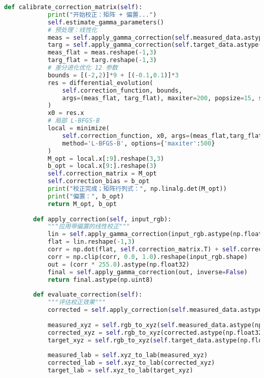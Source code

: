 \begin{lstlisting}[language=Python]
        def calibrate_correction_matrix(self):
            print("开始校正：矩阵 + 偏置...")
            self.estimate_gamma_parameters()
            # 预处理：线性化
            meas = self.apply_gamma_correction(self.measured_data.astype(np.float32), inverse=True)/255.0
            targ = self.apply_gamma_correction(self.target_data.astype(np.float32), inverse=True)/255.0
            meas_flat = meas.reshape(-1,3)
            targ_flat = targ.reshape(-1,3)
            # 差分进化优化 12 参数
            bounds = [(-2,2)]*9 + [(-0.1,0.1)]*3
            res = differential_evolution(
                self.correction_function, bounds,
                args=(meas_flat, targ_flat), maxiter=200, popsize=15, seed=42
            )
            x0 = res.x
            # 局部 L-BFGS-B
            local = minimize(
                self.correction_function, x0, args=(meas_flat,targ_flat),
                method='L-BFGS-B', options={'maxiter':500}
            )
            M_opt = local.x[:9].reshape(3,3)
            b_opt = local.x[9:].reshape(3)
            self.correction_matrix = M_opt
            self.correction_bias = b_opt
            print("校正完成；矩阵行列式：", np.linalg.det(M_opt))
            print("偏置：", b_opt)
            return M_opt, b_opt
    
        def apply_correction(self, input_rgb):
            """应用带偏置的线性校正"""
            lin = self.apply_gamma_correction(input_rgb.astype(np.float32), inverse=True)/255.0
            flat = lin.reshape(-1,3)
            corr = np.dot(flat, self.correction_matrix.T) + self.correction_bias
            corr = np.clip(corr, 0.0, 1.0).reshape(input_rgb.shape)
            out = (corr * 255.0).astype(np.float32)
            final = self.apply_gamma_correction(out, inverse=False)
            return final.astype(np.uint8)
        
        def evaluate_correction(self):
            """评估校正效果"""
            corrected = self.apply_correction(self.measured_data.astype(np.float32))
            
            measured_xyz = self.rgb_to_xyz(self.measured_data.astype(np.float32))
            corrected_xyz = self.rgb_to_xyz(corrected.astype(np.float32))
            target_xyz = self.rgb_to_xyz(self.target_data.astype(np.float32))
            
            measured_lab = self.xyz_to_lab(measured_xyz)
            corrected_lab = self.xyz_to_lab(corrected_xyz)
            target_lab = self.xyz_to_lab(target_xyz)
            

\end{lstlisting}
